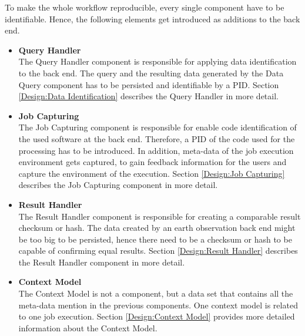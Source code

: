 \documentclass[draft,final]{vutinfth} %
\begin{document}
To make the whole workflow reproducible, every single component have to be identifiable. Hence, the following elements get introduced as additions to the back end.
  
 \begin{itemize}
	\item \textbf{Query Handler} \\
	The Query Handler component is responsible for applying data identification to the back end. The query and the resulting data generated by the Data Query component has to be persisted and identifiable by a PID. Section \ref{Design:Data Identification} describes the Query Handler in more detail.     
	\item \textbf{Job Capturing} \\ 
	The Job Capturing component is responsible for enable code identification of the used software at the back end. Therefore, a PID of the code used for the processing has to be introduced. In addition, meta-data of the job execution environment gets captured, to gain feedback information for the users and capture the environment of the execution. Section \ref{Design:Job Capturing} describes the Job Capturing component in more detail.
	\item \textbf{Result Handler} \\
	The Result Handler component is responsible for creating a comparable result checksum or hash. The data created by an earth observation back end might be too big to be persisted, hence there need to be a checksum or hash to be capable of confirming equal results. Section \ref{Design:Result Handler} describes the Result Handler component in more detail.   
	\item \textbf{Context Model} \\ 
	The Context Model is not a component, but a data set that contains all the meta-data mention in the previous components. One context model is related to one job execution. Section \ref{Design:Context Model} provides more detailed information about the Context Model. 
\end{itemize}
\end{document}
